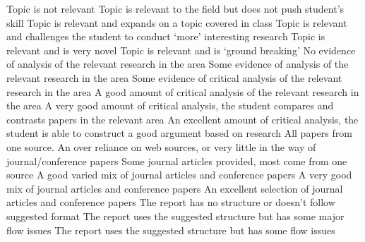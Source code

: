 \documentclass{../../fal_assignment}
\begin{document}
\begin{markingrubric}
%
	\grade\fail Topic is not relevant
	\grade Topic is relevant to the field but does not push student's skill
	\grade Topic is relevant and expands on a topic covered in class
	\grade Topic is relevant and challenges the student to conduct `more' interesting research
	\grade Topic is relevant and is very novel
	\grade Topic is relevant and is `ground breaking'
%
%
        \grade\fail No evidence of analysis of the relevant research in the area
        \grade Some evidence of analysis of the relevant research in the area
        \grade Some evidence of critical analysis of the relevant research in the area
        \grade A good amount of critical analysis of the relevant research in the area
        \grade A very good amount of critical analysis, the student compares and contrasts papers in the relevant area
        \grade An excellent amount of critical analysis, the student is able to construct a good argument based on research
%
        \grade\fail All papers from one source.
        \grade An over reliance on web sources, or very little in the way of journal/conference papers 
        \grade Some journal articles provided, most come from one source
        \grade A good varied mix of journal articles and conference papers
        \grade A very good mix of journal articles and conference papers
        \grade An excellent selection of journal articles and conference papers
%            
        \grade\fail The report has no structure or doesn't follow suggested format
        \grade The report uses the suggested structure but has some major flow issues
        \grade The report uses the suggested structure but has some flow issues

\end{markingrubric}
\end{document}
